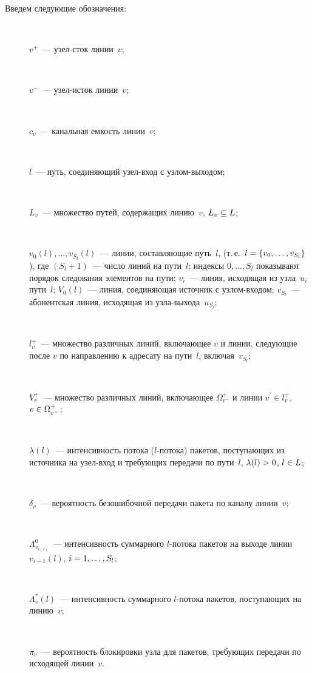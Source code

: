 \begin{multicols}{2}
Введем следующие обозначения:
\begin{description}
\item[\,] $v^+$~--- узел-сток линии~$v$;
\item[\,] $v^-$~--- узел-исток линии~$v$;
\item[\,] $c_v$~--- канальная емкость линии~$v$;
\item[\,] $l$~--- путь, соединяющий узел-вход с узлом-вы\-хо\-дом;
\item[\,] $L_v$~--- множество путей, содержащих линию~$v$, 
$L_v\hm\subseteq L$;
\item[\,] $v_0(l), \ldots , v_{S_l}(l)$~--- линии, составляющие путь~$l$, 
(т.\,е.\ $l\hm=\{v_0, \ldots , v_{S_l}\}$), где $(S_l+1)$~--- число линий на 
пути~$l$; индексы $0, \ldots , S_l$ показывают порядок следования 
элементов на пути; $v_i$~--- линия, исходящая из узла~$u_i$ пути~$l$; 
$V_0(l)$~--- линия, соединяющая источник с узлом-вхо\-дом; $v_{S_l}$~--- 
абонентская линия, исходящая из уз\-ла-вы\-хо\-да~$u_{S_l}$;
\item[\,] $l_v^+$~--- множество различных линий, включающее $v$ и 
линии, следующие после $v$ по направлению к адресату на пути~$l$, 
включая~$v_{S_l}$;
\item[\,] $V_v^+$~--- множество различных линий, включающее 
$\Omega_{v^-}^+$ и линии $v^\prime \in l_v^+$, $v\hm\in \Omega^+_{v^-
}$;
\item[\,] $\lambda(l)$~--- интенсивность потока ($l$-потока) пакетов, 
поступающих из источника на узел-вход и требующих передачи по 
пути~$l$, $\lambda(l)\hm>0$, $l\hm\in L$;
\item[\,] $\delta_v$~--- вероятность безошибочной передачи пакета по 
каналу линии~$v$;
\item[\,] $\Lambda^0_{v_{i(l)}}$~--- интенсивность суммарного $l$-потока 
пакетов на выходе линии $v_{i-1}(l)$, $i\hm=1, \ldots , S_l$;
\item[\,] $\Lambda^*_v(l)$~--- интенсивность суммарного $l$-потока 
пакетов, поступающих на линию~$v$;
\item[\,] $\pi_v$~--- вероятность блокировки узла для пакетов, требующих 
передачи по исходящей линии~$v$.
\end{description}
   

\end{multicols}
